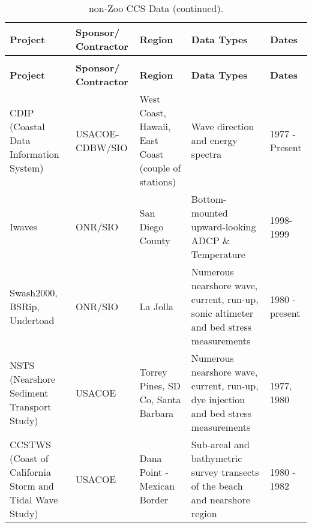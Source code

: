 \begin{longtable}{|p{0.75in}|p{0.75in}|p{1.0in}|p{1.25in}|p{0.75in}|}
  \caption{non-Zoo CCS Data.\label{II,table2}}
\\ \hline
\textbf{Project} & \textbf{Sponsor/ Contractor} & \textbf{Region} &
      \textbf{Data Types} &    \textbf{Dates} \\ \hline
\endfirsthead
\caption{non-Zoo CCS Data (continued).}
\\ \hline
\textbf{Project} & \textbf{Sponsor/ Contractor} & \textbf{Region} &
      \textbf{Data Types} &    \textbf{Dates} \\ \hline
\endhead
\hline
\endfoot
CDIP (Coastal Data Information System) &
USACOE-CDBW/SIO &
West Coast, Hawaii, East Coast (couple of stations) &
Wave direction and 
energy spectra &
1977 - Present \\ \hline
Iwaves &
ONR/SIO &
San Diego County &
Bottom-mounted 
upward-looking ADCP 
\& Temperature &
1998-1999 \\ \hline
Swash2000, BSRip, Undertoad &
ONR/SIO &
La Jolla &
Numerous nearshore 
wave, current, run-up, 
sonic altimeter and bed 
stress measurements &
1980 - present \\ \hline
NSTS (Nearshore Sediment Transport Study) &
USACOE &
Torrey Pines, SD Co,
Santa Barbara &
Numerous nearshore 
wave, current, run-up, 
dye injection and bed 
stress measurements &
1977, 1980 \\ \hline
CCSTWS (Coast of California Storm and Tidal Wave Study) &
USACOE &
Dana Point - 
Mexican Border &
Sub-areal and 
bathymetric survey 
transects of the beach 
and nearshore region &
1980 - 1982 \\ \hline
\end{longtable}



